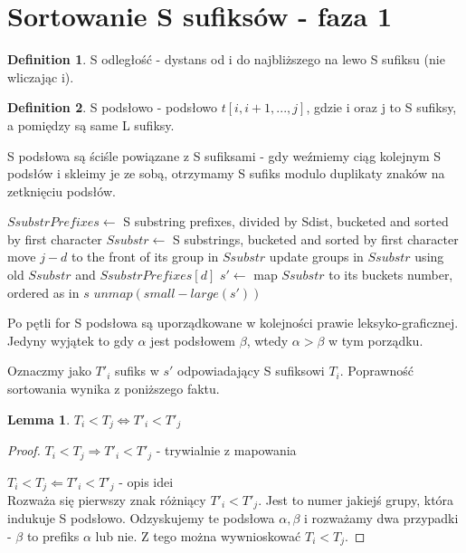 \documentclass[
12pt
]{article}
\newtheorem{lemma}[theorem]{Lemma}
\theoremstyle{definition}
\newtheorem{definition}{Definition}
\theoremstyle{remark}
\begin{document}
\section*{Sortowanie S sufiksów - faza 1}

\begin{definition}
S odległość - dystans od i do najbliższego na lewo S sufiksu (nie wliczając i).
\end{definition}

\begin{definition}
S podsłowo - podsłowo $t[i,i+1,...,j]$, gdzie i oraz j to S sufiksy, a pomiędzy są same L sufiksy.
\end{definition}

S podsłowa są ściśle powiązane z S sufiksami - gdy weźmiemy ciąg kolejnym S podsłów i skleimy je ze sobą, otrzymamy S sufiks modulo duplikaty znaków na zetknięciu podsłów.

\begin{algorithmic}
\State $SsubstrPrefixes \gets$ S substring prefixes, divided by Sdist, bucketed and sorted by first character
\State $Ssubstr \gets$ S substrings, bucketed and sorted by first character
\State move $j-d$ to the front of its group in $Ssubstr$
\EndFor
\State update groups in $Ssubstr$ using old $Ssubstr$ and $SsubstrPrefixes[d]$ 
\EndFor
\State $s' \gets$ map $Ssubstr$ to its buckets number, ordered as in $s$
\State \Return $unmap(small-large(s'))$
\EndProcedure
\end{algorithmic}

Po pętli for S podsłowa są uporządkowane w kolejności prawie leksyko-graficznej. Jedyny wyjątek to gdy $\alpha$ jest podsłowem $\beta$, wtedy $\alpha > \beta$ w tym porządku.

Oznaczmy jako $T'_i$ sufiks w $s'$ odpowiadający S sufiksowi $T_i$. Poprawność sortowania wynika z poniższego faktu.

\begin{lemma}
$T_i < T_j \iff T'_i < T'_j$
\end{lemma}
\begin{proof}
\item[$T_i < T_j \Rightarrow T'_i < T'_j$] - trywialnie z mapowania
\item[$T_i < T_j \Leftarrow T'_i < T'_j$] - opis idei\\
Rozważa się pierwszy znak różniący $T'_i < T'_j$. Jest to numer jakiejś grupy, która indukuje S podsłowo. Odzyskujemy te podsłowa $\alpha,\beta$ i rozważamy dwa przypadki - $\beta$ to prefiks $\alpha$ lub nie. Z tego można wywnioskować $T_i < T_j$.
\end{proof}
\end{document}
